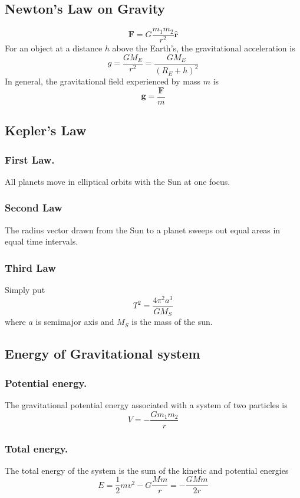 \documentclass[../../../main.tex]{subfiles}
\begin{document}
\subsection{Newton's Law on Gravity}
\begin{equation*}
    \mathbf{F}=G\frac{m_1m_2}{r^2}\mathbf{\hat{r}}
\end{equation*}
For an object at a distance $h$ above the Earth's, the gravitational acceleration is 
\begin{equation*}
    g=\frac{GM_E}{r^2}=\frac{GM_E}{(R_E+h)^2}
\end{equation*}
In general, the gravitational field experienced by mass $m$ is 
\begin{equation*}
    \mathbf{g}=\frac{\mathbf{F}}{m}
\end{equation*}


\subsection{Kepler's Law}
\subsubsection{First Law.} All planets move in elliptical orbits with the Sun at one focus.
\subsubsection{Second Law} The radius vector drawn from the Sun to a planet sweeps out equal areas in equal time intervals.
\subsubsection{Third Law} Simply put 
\begin{equation*}
    T^2=\frac{4\pi^2a^3}{GM_S}
\end{equation*}
where $a$ is semimajor axis and $M_S$ is the mass of the sun. 

\subsection{Energy of Gravitational system}
\subsubsection{Potential energy.} The gravitational potential energy associated with a system of two particles is
\begin{equation*}
    V=-\frac{Gm_1m_2}{r}
\end{equation*}
\subsubsection{Total energy.} The total energy of the system is the sum
of the kinetic and potential energies
\begin{equation*}
    E=\frac{1}{2}mv^2-G\frac{Mm}{r}=-\frac{GMm}{2r}
\end{equation*}
\end{document}
